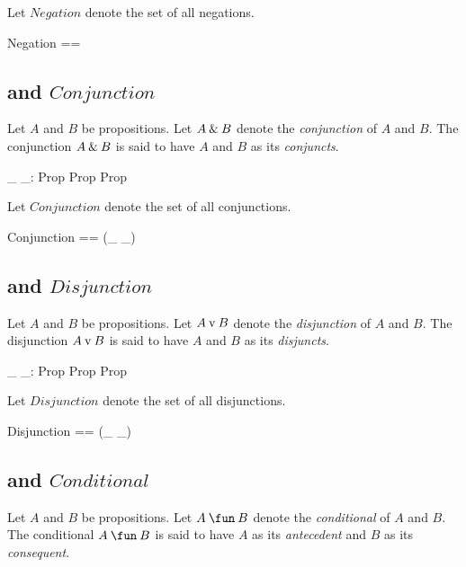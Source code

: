 \documentclass[11pt, oneside]{article}
\begin{document}
Let $Negation$ denote the set of all negations.

\begin{zed}
	Negation == \ran \notProp
\end{zed}

\subsection{ and $Conjunction$}

Let $A$ and $B$ be propositions.
Let $A \mathbin{\&} B$ denote the {\it conjunction} of $A$ and $B$.
The conjunction $A \mathbin{\&} B$ is said to have $A$ and $B$ as its {\it conjuncts}.

\begin{axdef}
	\_ \andProp \_: Prop \cross Prop \inj Prop
\end{axdef}

Let $Conjunction$ denote the set of all conjunctions.

\begin{zed}
	Conjunction == \ran (\_ \andProp \_)
\end{zed}

\subsection{ and $Disjunction$}

Let $A$ and $B$ be propositions.
Let $A \mathbin{\mathrm{v}} B$ denote the {\it disjunction} of $A$ and $B$.
The disjunction $A \mathbin{\mathrm{v}} B$ is said to have $A$ and $B$ as its {\it disjuncts}.

\begin{axdef}
	\_ \orProp \_: Prop \cross Prop \inj Prop
\end{axdef}

Let $Disjunction$ denote the set of all disjunctions.

\begin{zed}
	Disjunction == \ran (\_ \orProp \_)
\end{zed}

\subsection{ and $Conditional$}

Let $A$ and $B$ be propositions.
Let $A \impliesProp B$ denote the {\it conditional} of $A$ and $B$.
The conditional $A \impliesProp B$ is said to have $A$ as its  {\it antecedent} and $B$ as its {\it consequent}.
\end{document}
